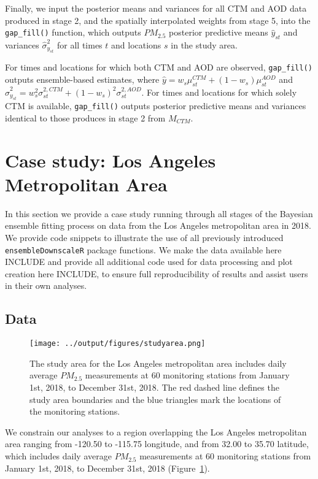 Finally, we input the posterior means and variances for all CTM and AOD data produced in stage 2, and the spatially interpolated weights from stage 5, into the \texttt{gap\_fill()} function, which outputs $PM_{2.5}$ posterior predictive means $\hat{y}_{st}$ and variances $\hat{\sigma}^{2}_{y_{st}}$ for all times $t$ and locations $s$ in the study area. 

For times and locations for which both CTM and AOD are observed, \texttt{gap\_fill()} outputs ensemble-based estimates, where $\hat{y} = w_s \mu^{CTM}_{st} + (1 - w_s)\mu^{AOD}_{st}$ and $\hat{\sigma}^2_{y_{st}} = w^2_s \sigma^{2, CTM}_{st} + (1 - w_s)^2 \sigma^{2, AOD}_{st}$. 
For times and locations for which solely CTM is available, \texttt{gap\_fill()} outputs posterior predictive means and variances identical to those produces in stage 2 from $M_{CTM}$. 



\section*{Case study: Los Angeles Metropolitan Area}

In this section we provide a case study running through all stages of the Bayesian ensemble fitting process on data from the Los Angeles metropolitan area in 2018. 
We provide code snippets to illustrate the use of all previously introduced \texttt{ensembleDownscaleR} package functions. 
We make the data available here INCLUDE and provide all additional code used for data processing and plot creation here INCLUDE, to ensure full reproducibility of results and assist users in their own analyses. 



\subsection*{Data}

\begin{figure}[ht]
    \centering
    \texttt{[image: ../output/figures/studyarea.png]}
    \caption{The study area for the Los Angeles metropolitan area includes daily average $PM_{2.5}$ measurements at 60 monitoring stations from January 1st, 2018, to December 31st, 2018. The red dashed line defines the study area boundaries and the blue triangles mark the locations of the monitoring stations.}
    \label{fig:pltstudyarea}
\end{figure}
We constrain our analyses to a region overlapping the Los Angeles metropolitan area ranging from -120.50 to -115.75 longitude, and from 32.00 to 35.70 latitude, which includes daily average $PM_{2.5}$ measurements at 60 monitoring stations from January 1st, 2018, to December 31st, 2018 (Figure~\ref{fig:pltstudyarea}).

